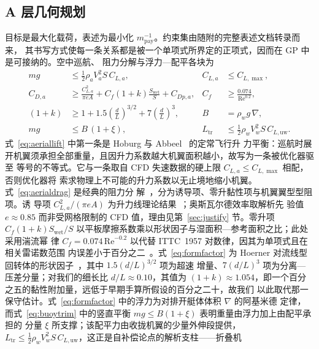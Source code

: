 \documentclass[a4paper,10pt,twocolumn]{ctexart}
\begin{document}
\subsection{A 层几何规划}
目标是最大化载荷，表述为最小化 $m_{\text{pay}}^{-1}$。约束集由随附的完整表述文档转录而来，
其书写方式使每一条关系都是被一个单项式所界定的正项式，因而在 GP 中是可接纳的。空中巡航、
阻力分解与浮力—配平各块为
\begin{align}
mg &\le \tfrac12\rho_a V_a^2 S\,C_{L,a}, & C_{L,a} &\le C_{L,\max}, \label{eq:aeriallift}\\
C_{D,a} &\ge \frac{C_{L,a}^2}{\pi e A} + C_{f}(1+k)\frac{S_{\text{wet}}}{S} + C_{Dp,a},
      & C_f &\ge \frac{0.074}{\mathrm{Re}^{0.2}}, \label{eq:aerialdrag}\\
(1+k) &\ge 1 + 1.5\!\left(\tfrac{d}{L}\right)^{3/2} + 7\!\left(\tfrac{d}{L}\right)^{3},
      & B &= \rho_w g\,\nabla, \label{eq:formfactor}\\
mg &\le B\,(1+\xi), & L_{\text{tr}} &\le \tfrac12\rho_w V_w^2 S\,C_{L,\text{uw}}. \label{eq:buoytrim}
\end{align}
式~\eqref{eq:aeriallift} 中第一条是 Hoburg 与 Abbeel~\cite{hoburg2014geometric} 的定常飞行升
力平衡：巡航时展开机翼须承担全部重量，且因升力系数越大机翼面积越小，故写为一条被优化器驱至
等号的不等式。它与一条取自 CFD 失速数据的硬上限 $C_{L,a}\le C_{L,\max}$ 相配，否则优化器将
索求物理上不可能的升力系数以无止境地缩小机翼。式~\eqref{eq:aerialdrag} 是经典的阻力分
解~\cite{hoburg2014geometric,hoerner1965fluid}，分为诱导项、零升黏性项与机翼翼型型阻项。诱
导项 $C_{L,a}^2/(\pi e A)$ 为升力线理论结果~\cite{hoerner1985fluid}；奥斯瓦尔德效率取解析先
验值 $e\approx0.85$ 而非受网格限制的 CFD 值，理由见第~\ref{sec:justify} 节。零升项
$C_f(1+k)S_{\text{wet}}/S$ 以平板摩擦系数乘以形状因子与湿面积—参考面积之比；此处采用湍流幂
律 $C_f=0.074\,\mathrm{Re}^{-0.2}$ 以代替 ITTC~1957 对数律，因其为单项式且在相关雷诺数范围
内误差小于百分之二~\cite{hoburg2014geometric,myring1976theoretical}。式~\eqref{eq:formfactor}
为 Hoerner 对流线型回转体的形状因子~\cite{hoerner1965fluid}，其中 $1.5(d/L)^{3/2}$ 项为超速
增量、$7(d/L)^3$ 项为分离—压差分量；对我们的细长比 $d/L\approx0.10$，其值为
$(1+k)\approx1.054$，即一个百分之五的黏性附加量，远低于早期手算所假设的百分之二十，故我们
以此取代那一保守估计。式~\eqref{eq:formfactor} 中的浮力为对排开艇体体积 $\nabla$ 的阿基米德
定律，而式~\eqref{eq:buoytrim} 中的竖直平衡 $mg\le B(1+\xi)$ 表明重量由浮力加上由配平承担的
分量 $\xi$ 所支撑；该配平力由收拢机翼的少量外伸段提供，
$L_{\text{tr}}\le\tfrac12\rho_w V_w^2 S\,C_{L,\text{uw}}$，这正是自补偿论点的解析支柱——折叠机
\end{document}
